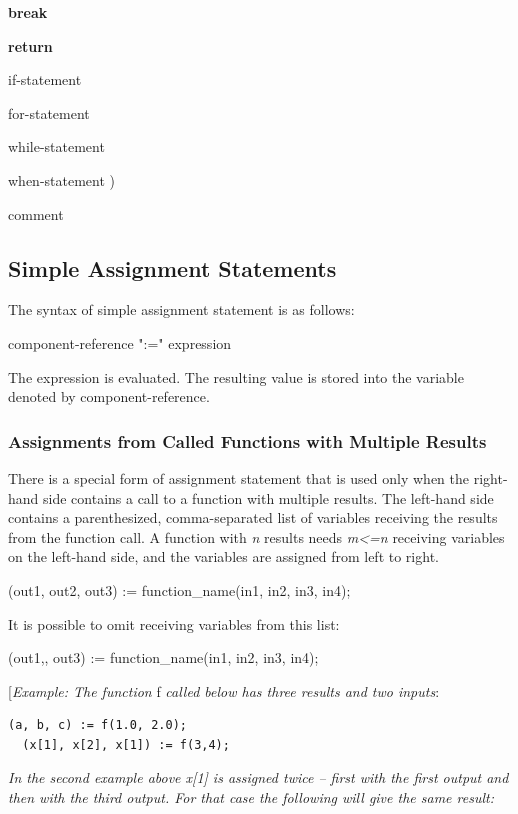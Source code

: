 \documentclass[10pt,a4paper]{report}
\def\doublelabel#1{\label{#1}\hypertarget{#1}{}}
\begin{document}
\textbar{} \textbf{break}

\textbar{} \textbf{return}

\textbar{} if-statement

\textbar{} for-statement

\textbar{} while-statement

\textbar{} when-statement )

comment

\subsection{Simple Assignment Statements}\doublelabel{simple-assignment-statements}

The syntax of simple assignment statement is as follows:

component-reference ":=" expression

The expression is evaluated. The resulting value is stored into the
variable denoted by component-reference.

\subsubsection{Assignments from Called Functions with Multiple Results}\doublelabel{assignments-from-called-functions-with-multiple-results}

There is a special form of assignment statement that is used only when
the right-hand side contains a call to a function with multiple results.
The left-hand side contains a parenthesized, comma-separated list of
variables receiving the results from the function call. A function with
\emph{n} results needs \emph{m\textless{}=n} receiving variables on the
left-hand side, and the variables are assigned from left to right.

(out1, out2, out3) := function\_name(in1, in2, in3, in4);

It is possible to omit receiving variables from this list:

(out1,, out3) := function\_name(in1, in2, in3, in4);

{[}\emph{Example: The function} f \emph{called below has three results
and two inputs}:

\begin{lstlisting}[language=modelica]
  (a, b, c) := f(1.0, 2.0);
  (x[1], x[2], x[1]) := f(3,4);
\end{lstlisting}
\emph{In the second example above x{[}1{]} is assigned twice -- first
with the first output and then with the third output. For that case the
following will give the same result:}
\end{document}
